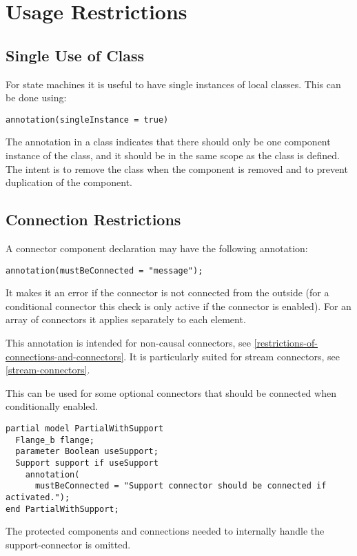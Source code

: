 \section{Usage Restrictions}\label{usage-restrictions}
\subsection{Single Use of Class}\label{annotation-for-single-use-of-class}\label{single-use-of-class}

For state machines it is useful to have single instances of local classes.
This can be done using:
\begin{lstlisting}[language=modelica]
annotation(singleInstance = true)
\end{lstlisting}

The annotation  in a class indicates that there should only be one component instance of the class, and it should be in the same scope as the class is defined.
The intent is to remove the class when the component is removed and to prevent duplication of the component.

\subsection{Connection Restrictions}\label{connection-restrictions}

A connector component declaration may have the following annotation:
\begin{lstlisting}[language=modelica]
annotation(mustBeConnected = "message");
\end{lstlisting}%

It makes it an error if the connector is not connected from the outside (for a conditional connector this check is only active if the connector is enabled).
For an array of connectors it applies separately to each element.

\begin{nonnormative}
This annotation is intended for non-causal connectors, see \cref{restrictions-of-connections-and-connectors}.
It is particularly suited for stream connectors, see \cref{stream-connectors}.
\end{nonnormative}

\begin{example}
This can be used for some optional connectors that should be connected when conditionally enabled.
\begin{lstlisting}[language=modelica]
partial model PartialWithSupport
  Flange_b flange;
  parameter Boolean useSupport;
  Support support if useSupport
    annotation(
      mustBeConnected = "Support connector should be connected if activated.");
end PartialWithSupport;
\end{lstlisting}
The protected components and connections needed to internally handle the support-connector is omitted.
\end{example}

